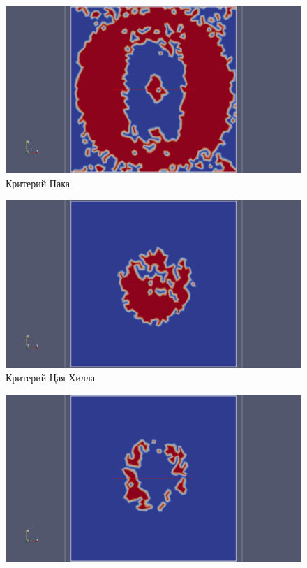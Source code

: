 \documentclass[xcolor={usenames,dvipsnames,svgnames,table}]{beamer}
\begin{document}
\begin{frame}
\begin{center}
\begin{minipage}[h]{0.33\textwidth}
            \begin{figure}[h]
                \includegraphics[width=\textwidth]{png/destruction/2lc-puck-delam.png}
                \tiny
                \caption{Критерий Пака}
            \end{figure}
        \end{minipage}
        \begin{minipage}[h]{0.33\textwidth}
            \begin{figure}[h]
                \includegraphics[width=\textwidth]{png/destruction/2lc-tsaihill-delam.png}
                \tiny
                \caption{Критерий Цая-Хилла}
            \end{figure}
        \end{minipage}
        \begin{minipage}[h]{0.33\textwidth}
            \begin{figure}[h]
                \includegraphics[width=\textwidth]{png/destruction/2lc-tsaiwu-delam.png}

\end{figure}
\end{minipage}
\end{center}
\end{frame}
\end{document}
